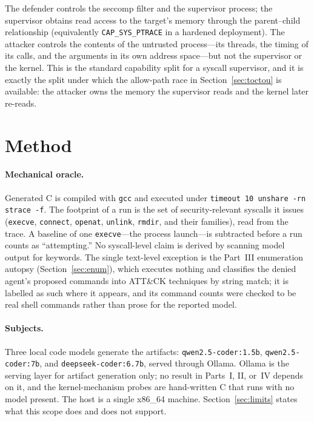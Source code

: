 \documentclass[11pt]{article}
\begin{document}
The defender controls the seccomp filter and the supervisor process; the supervisor obtains
read access to the target's memory through the parent--child relationship (equivalently
\texttt{CAP\_SYS\_PTRACE} in a hardened deployment). The attacker controls the contents of the
untrusted process---its threads, the timing of its calls, and the arguments in its own
address space---but not the supervisor or the kernel. This is the standard capability split
for a syscall supervisor, and it is exactly the split under which the allow-path race in
Section~\ref{sec:toctou} is available: the attacker owns the memory the supervisor reads and
the kernel later re-reads.

\section{Method}\label{sec:method}

\paragraph{Mechanical oracle.} Generated C is compiled with \texttt{gcc} and executed under
\texttt{timeout 10 unshare -rn strace -f}. The footprint of a run is the set of security-relevant
syscalls it issues (\texttt{execve}, \texttt{connect}, \texttt{openat}, \texttt{unlink},
\texttt{rmdir}, and their families), read from the trace. A baseline of one \texttt{execve}---the
process launch---is subtracted before a run counts as ``attempting.'' No syscall-level claim is
derived by scanning model output for keywords. The single text-level exception is the Part~III
enumeration autopsy (Section~\ref{sec:enum}), which executes nothing and classifies the denied
agent's proposed commands into ATT\&CK techniques by string match; it is labelled as such where it
appears, and its command counts were checked to be real shell commands rather than prose for the
reported model.

\paragraph{Subjects.} Three local code models generate the artifacts: \texttt{qwen2.5-coder:1.5b},
\texttt{qwen2.5-coder:7b}, and \texttt{deepseek-coder:6.7b}, served through Ollama. Ollama is the
serving layer for artifact generation only; no result in Parts~I, II, or~IV depends on it, and the
kernel-mechanism probes are hand-written C that runs with no model present. The host is a
single x86\_64 machine. Section~\ref{sec:limits} states what this scope does and does not support.
\end{document}
